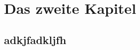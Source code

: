 \chapter{Das zweite Kapitel}
\blindtext
\clearpage
\blindtext
\section{adkjfadkljfh}
\blindtext
\clearpage
\blindtext
